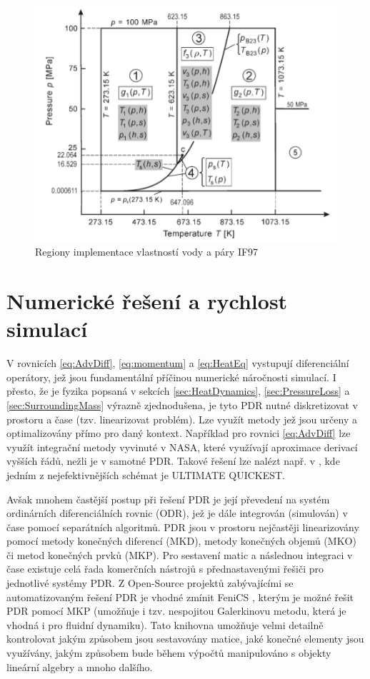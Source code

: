 \begin{figure}[h] \centering \capstart
  \includegraphics[scale=0.7]{figures/IF97}
  \caption{Regiony implementace vlastností vody a páry IF97 \cite{IAPWS2007}}
  \label{fig:IF97}
\end{figure}

\section{Numerické řešení a rychlost simulací}
\label{sec:NumSpeed}
V rovnicích \ref{eq:AdvDiff}, \ref{eq:momentum} a \ref{eq:HeatEq} vystupují
diferenciální operátory, jež jsou fundamentální příčinou numerické náročnosti
simulací. I přesto, že je fyzika popsaná v sekcích \ref{sec:HeatDynamics},
\ref{sec:PressureLoss} a \ref{sec:SurroundingMass} výrazně zjednodušena, je
tyto PDR nutné diskretizovat v prostoru a čase (tzv. linearizovat problém). Lze
využít metody jež jsou určeny a optimalizovány přímo pro daný kontext.
Například pro rovnici \ref{eq:AdvDiff} lze využít integrační metody vyvinuté v
NASA, které využívají aproximace derivací vyšších řádů, nežli je v samotné PDR.
Takové řešení lze nalézt např. v \cite{leonard1988}, kde jedním z
nejefektivnějších schémat je ULTIMATE QUICKEST.

Avšak mnohem častější postup při řešení PDR je její převedení na systém
ordinárních diferenciálních rovnic (ODR), jež je dále integrován (simulován) v
čase pomocí separátních algoritmů. PDR jsou v prostoru nejčastěji linearizovány
pomocí metody konečných diferencí (MKD), metody konečných objemů (MKO) či
metod konečných prvků (MKP). Pro sestavení matic a následnou integraci v čase
existuje celá řada komerčních nástrojů s přednastavenými řešiči pro jednotlivé
systémy PDR. Z Open-Source projektů zabývajícími se automatizovaným řešení PDR
je vhodné zmínit FeniCS \cite{AlnaesBlechta2015a}, kterým je možné řešit PDR
pomocí MKP (umožňuje i tzv. nespojitou Galerkinovu metodu, která je vhodná i
pro fluidní dynamiku). Tato knihovna umožňuje velmi detailně kontrolovat jakým
způsobem jsou sestavovány matice, jaké konečné elementy jsou využívány, jakým
způsobem bude během výpočtů manipulováno s objekty lineární algebry a mnoho
dalšího.

